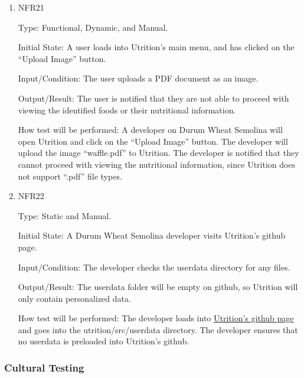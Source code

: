 \documentclass[12pt, titlepage]{article}
\begin{document}
\begin{enumerate}

\item{NFR21\\} 

Type: Functional, Dynamic, and Manual.

Initial State: A user loads into Utrition’s main menu, and has clicked on the “Upload Image” button.

Input/Condition: The user uploads a PDF document as an image.

Output/Result: The user is notified that they are not able to proceed with viewing the identified foods or their nutritional information.

How test will be performed: A developer on Durum Wheat Semolina will open Utrition and click on the “Upload Image” button. The developer will upload the image “waffle.pdf” to Utrition. The developer is notified that they cannot proceed with viewing the nutritional information, since Utrition does not support “.pdf” file types.

\item{NFR22\\} 

Type: Static and Manual.

Initial State: A Durum Wheat Semolina developer visits Utrition’s github page.

Input/Condition: The developer checks the userdata directory for any files.

Output/Result: The userdata folder will be empty on github, so Utrition will only contain personalized data.

How test will be performed: The developer loads into \href{https://github.com/jeff-rey-wang/utrition/}{Utrition’s github page} and goes into the utrition/src/userdata directory. The developer ensures that no userdata is preloaded into Utrition’s github.


\end{enumerate}

\subsubsection{Cultural Testing}

\end{document}
